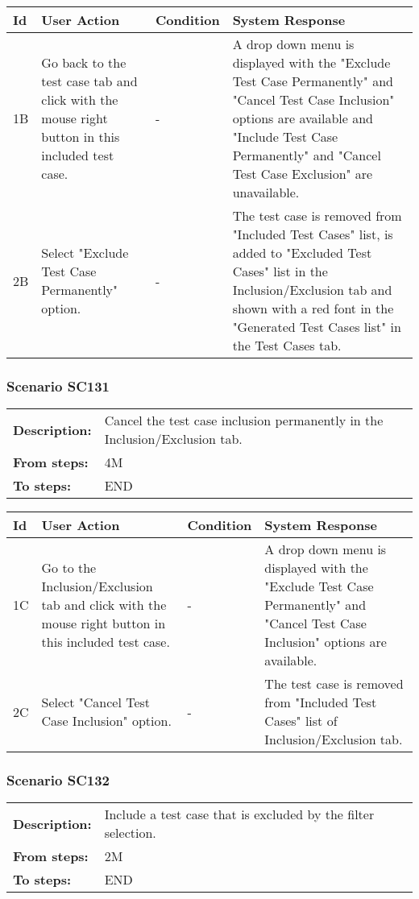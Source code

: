 \documentclass[a4paper,11pt]{article}
\newcommand{\bl}{\\ \hline}
\begin{document}
\begin{tabular}{|p{0.8in}|p{1.6in}|p{1.6in}|p{1.6in}|}
\hline
Id & User Action & Condition & System Response  \bl 
1B & Go back to the test case tab and click with the mouse right
						button in this included test case. & - & A drop down menu is displayed with the "Exclude Test Case
						Permanently" and "Cancel Test Case Inclusion" options are
						available and "Include Test Case Permanently" and "Cancel Test
						Case Exclusion" are unavailable. \bl 
2B & Select "Exclude Test Case Permanently" option. & - & The test case is removed from "Included Test Cases" list,
						is added to "Excluded Test Cases" list in the Inclusion/Exclusion
						tab and shown with a red font in the "Generated Test Cases list"
						in the Test Cases tab. \bl 
\end{tabular}
\subsubsection*{Scenario SC131}
\begin{tabular}{p{1in}p{4in}}
{\bf Description:} & Cancel the test case inclusion permanently in the
					Inclusion/Exclusion tab. \\
{\bf From steps:} & 4M \\
{\bf To steps:} & END \\
\end{tabular}
 
\begin{tabular}{|p{0.8in}|p{1.6in}|p{1.6in}|p{1.6in}|}
\hline
Id & User Action & Condition & System Response  \bl 
1C & Go to the Inclusion/Exclusion tab and click with the mouse
						right button in this included test case. & - & A drop down menu is displayed with the "Exclude Test Case
						Permanently" and "Cancel Test Case Inclusion" options are
						available.  \bl 
2C & Select "Cancel Test Case Inclusion" option. & - & The test case is removed from "Included Test Cases" list
						of Inclusion/Exclusion tab. \bl 
\end{tabular}
\subsubsection*{Scenario SC132}
\begin{tabular}{p{1in}p{4in}}
{\bf Description:} & Include a test case that is excluded by the filter
					selection. \\
{\bf From steps:} & 2M \\
{\bf To steps:} & END \\
\end{tabular}
 
\end{document}
